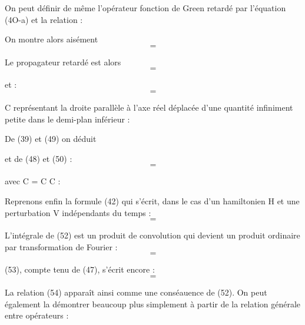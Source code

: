 On peut définir de même l'opérateur fonction de Green retardé  par
l'équation (4O-a) et la relation :

On montre alors aisément
\[
\tag{49}=
\]

Le propagateur retardé est alors
\[
=
\]

et :
\[
\tag{50}=
\]

C représentant la droite parallèle à l'axe réel déplacée d'une quantité
infiniment petite dans le demi-plan inférieur :

De (39) et (49) on déduit

et de (48) et (50) :
\[
\tag{51}=
\]

avec C = C  C :

Reprenons enfin la formule (42) qui s'écrit, dans le cas d'un
hamiltonien H et une perturbation V indépendants du temps :
\[
\tag{52}=
\]

L'intégrale de (52) est un produit de convolution qui devient un produit
ordinaire par transformation de Fourier :
\[
\tag{53}=
\]

(53), compte tenu de (47), s'écrit encore :
\[
\tag{54}=
\]

La relation (54) apparaît ainsi comme une conséauence de (52). On peut
également la démontrer beaucoup plus simplement à partir de la relation
générale entre opérateurs :
